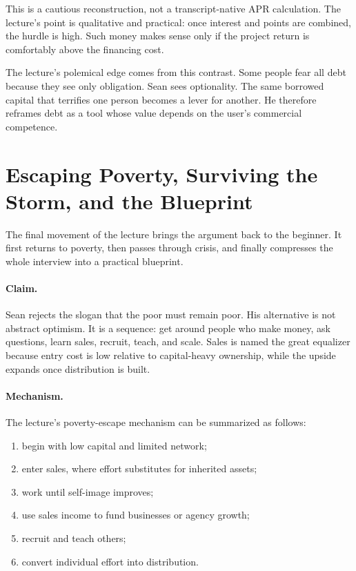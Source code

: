 \begin{remark}
This is a cautious reconstruction, not a transcript-native APR calculation. The lecture's point is qualitative and practical: once interest and points are combined, the hurdle is high. Such money makes sense only if the project return is comfortably above the financing cost.
\end{remark}

The lecture's polemical edge comes from this contrast. Some people fear all debt because they see only obligation. Sean sees optionality. The same borrowed capital that terrifies one person becomes a lever for another. He therefore reframes debt as a tool whose value depends on the user's commercial competence.

\section{Escaping Poverty, Surviving the Storm, and the Blueprint}

The final movement of the lecture brings the argument back to the beginner. It first returns to poverty, then passes through crisis, and finally compresses the whole interview into a practical blueprint.

\paragraph{Claim.}
Sean rejects the slogan that the poor must remain poor. His alternative is not abstract optimism. It is a sequence: get around people who make money, ask questions, learn sales, recruit, teach, and scale. Sales is named the great equalizer because entry cost is low relative to capital-heavy ownership, while the upside expands once distribution is built.

\paragraph{Mechanism.}
The lecture's poverty-escape mechanism can be summarized as follows:
\begin{enumerate}
\item begin with low capital and limited network;
\item enter sales, where effort substitutes for inherited assets;
\item work until self-image improves;
\item use sales income to fund businesses or agency growth;
\item recruit and teach others;
\item convert individual effort into distribution.
\end{enumerate}

